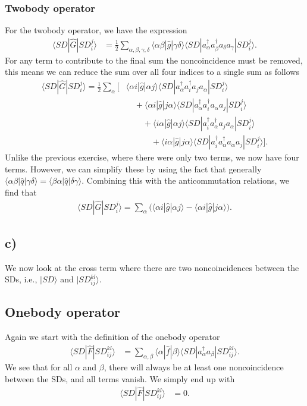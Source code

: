 \documentclass[a4paper, 11pt, notitlepage, english]{article}
\newcommand{\ket}[1]{|#1 \rangle}
\newcommand{\op}[1]{\hat{#1}}
\newcommand{\braopket}[3]{\langle #1 | {#2} | #3 \rangle}
\begin{document}
\subsubsection*{Twobody operator}
For the twobody operator, we have the expression
\begin{align*}
\braopket{SD}{\op{G}}{SD_i^j}
&= \frac{1}{2}\sum_{\alpha, \beta, \gamma, \delta} \braopket{\alpha\beta}{\op{g}}{\gamma\delta}\braopket{SD}{a_\alpha^\dag a_\beta^\dag a_\delta a_\gamma}{SD_i^j}.
\end{align*}
For any term to contribute to the final sum the noncoincidence must be removed, this means we can reduce the sum over all four indices to a single sum as follows
\begin{align*}
\braopket{SD}{\op{G}}{SD_i^j}
= \frac{1}{2}\sum_{\alpha} \big[
&\braopket{\alpha i}{\op{g}}{\alpha j}\braopket{SD}{a_\alpha^\dag a_i^\dag a_j a_\alpha}{SD_i^j} \\[-0.3cm]
&\quad+ \braopket{\alpha i}{\op{g}}{j \alpha}\braopket{SD}{a_\alpha^\dag a_i^\dag a_\alpha a_j}{SD_i^j} \\
&\qquad+ \braopket{i \alpha}{\op{g}}{\alpha j}\braopket{SD}{a_i^\dag a_\alpha^\dag a_j a_\alpha}{SD_i^j} \\
&\qquad\quad+ \braopket{i \alpha}{\op{g}}{j \alpha}\braopket{SD}{a_i^\dag a_\alpha^\dag a_\alpha a_j}{SD_i^j}\big].
\end{align*}
Unlike the previous exercise, where there were only two terms, we now have four terms. However, we can simplify these by using the fact that generally $\braopket{\alpha\beta}{\op{q}}{\gamma\delta} = \braopket{\beta\alpha}{\op{q}}{\delta\gamma}$. Combining this with the anticommutation relations, we find that 
\begin{align*}
\braopket{SD}{\op{G}}{SD_i^j}
= \sum_{\alpha} \bigg(\braopket{\alpha i}{\op{g}}{\alpha j} - \braopket{\alpha i}{\op{g}}{j \alpha}\bigg).
\end{align*}

\clearpage

\subsection*{c)}
We now look at the cross term where there are two noncoincidences between the SDs, i.e., $\ket{SD}$ and $\ket{SD_{ij}^{kl}}$.

\subsection*{Onebody operator}
Again we start with the definition of the onebody operator
\begin{align*}
\braopket{SD}{\op{F}}{SD_{ij}^{kl}} 
&= \sum_{\alpha, \beta} \braopket{\alpha}{\op{f}}{\beta}\braopket{SD}{a_\alpha^\dag a_\beta}{SD_{ij}^{kl}}.
\end{align*}
We see that for all $\alpha$ and $\beta$, there will always be at least one noncoincidence between the SDs, and all terms vanish. We simply end up with
\begin{align*}
\braopket{SD}{\op{F}}{SD_{ij}^{kl}} 
&= 0.
\end{align*}
\end{document}

